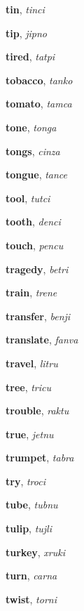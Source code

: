 \documentclass[12pt]{book}
\begin{document}
\begin{description}
\item[ ] \textbf{tin}, \textit{tinci}

\item[ ] \textbf{tip}, \textit{jipno}

\item[ ] \textbf{tired}, \textit{tatpi}

\item[ ] \textbf{tobacco}, \textit{tanko}

\item[ ] \textbf{tomato}, \textit{tamca}

\item[ ] \textbf{tone}, \textit{tonga}

\item[ ] \textbf{tongs}, \textit{cinza}

\item[ ] \textbf{tongue}, \textit{tance}

\item[ ] \textbf{tool}, \textit{tutci}

\item[ ] \textbf{tooth}, \textit{denci}

\item[ ] \textbf{touch}, \textit{pencu}

\item[ ] \textbf{tragedy}, \textit{betri}

\item[ ] \textbf{train}, \textit{trene}

\item[ ] \textbf{transfer}, \textit{benji}

\item[ ] \textbf{translate}, \textit{fanva}

\item[ ] \textbf{travel}, \textit{litru}

\item[ ] \textbf{tree}, \textit{tricu}

\item[ ] \textbf{trouble}, \textit{raktu}

\item[ ] \textbf{true}, \textit{jetnu}

\item[ ] \textbf{trumpet}, \textit{tabra}

\item[ ] \textbf{try}, \textit{troci}

\item[ ] \textbf{tube}, \textit{tubnu}

\item[ ] \textbf{tulip}, \textit{tujli}

\item[ ] \textbf{turkey}, \textit{xruki}

\item[ ] \textbf{turn}, \textit{carna}

\item[ ] \textbf{twist}, \textit{torni}



\end{description}
\end{document}
